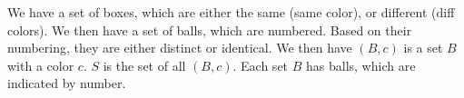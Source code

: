 
We have a set of boxes, which are either the same (same color), or different (diff colors). We then have a set of balls, which are numbered. Based on their numbering, they are either distinct or identical. We then have $(B,c)$ is a set $B$ with a color $c$. $S$ is the set of all $(B,c)$. Each set $B$ has balls, which are indicated by number.
